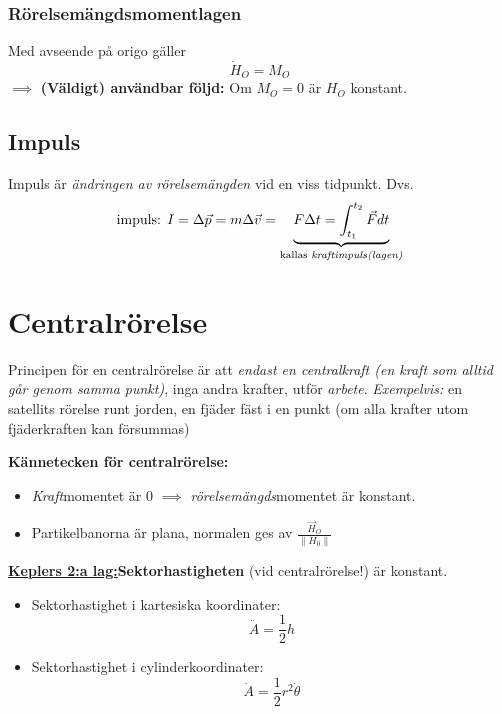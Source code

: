 \documentclass{article}
\newenvironment{ankiflashcard}[1]{}{}
\begin{document}
\begin{paracol}{2}
\begin{ankiflashcard}{Definiera rörelsemängdsmomentlagen.}
\subsubsection{Rörelsemängdsmomentlagen}
Med avseende på origo gäller
$$
\dot H_O = M_O
$$
$\implies$ \textbf{(Väldigt) användbar följd:} Om $M_O=0$ är $H_O$ konstant.
\end{ankiflashcard}


\begin{ankiflashcard}{Definiera vad impuls är. Definiera även kraftimpulslagen.}
    
\subsection{Impuls}
Impuls är \textit{ändringen av rörelsemängden} vid en viss tidpunkt. Dvs.
$$\text{impuls: } I = \Delta \vec p = m \Delta \vec v = \underbrace{F\Delta t =  \int_{t_1}^{t_2} \vec F dt}_{\text{kallas \textit{kraftimpuls(lagen)}}}$$
\end{ankiflashcard}

\begin{ankiflashcard}{Definiera centralrörelse och dess kännetecken.}
    \section{Centralrörelse}
  
    Principen för en centralrörelse är att \textit{endast en centralkraft (en kraft som alltid går genom samma punkt)}, inga andra krafter, utför \textit{arbete}. \textit{Exempelvis:} en satellits rörelse runt jorden, en fjäder fäst i en punkt (om alla krafter utom fjäderkraften kan försummas)

    \textbf{Kännetecken för centralrörelse:}
    \begin{itemize}
        \item \textit{Kraft}momentet är $0$ $\implies$ \textit{rörelsemängds}momentet är konstant. 
        \item Partikelbanorna är plana, normalen ges av $\frac{\vec H_O}{\left\| H_0 \right\|}$
    \end{itemize}
\end{ankiflashcard}

\begin{ankiflashcard}{Definiera sektorhastigheten vid centralrörelse}
    \underline{\textbf{Keplers 2:a lag:}}\textbf{Sektorhastigheten} (vid centralrörelse!) är konstant.
    \begin{itemize}
        \item Sektorhastighet i kartesiska koordinater:
        $$\dot A = \frac 1 2 h$$
        \item  Sektorhastighet i cylinderkoordinater:     $$\dot A = \frac 1 2 r^2 \dot \theta$$
    \end{itemize}
\end{ankiflashcard}


\end{paracol}
\end{document}
